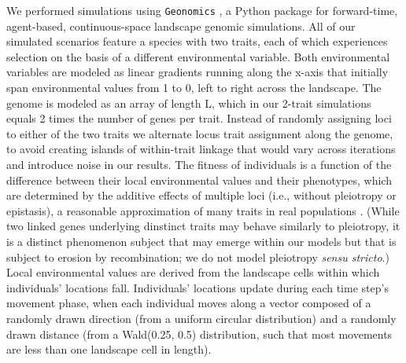 \documentclass[9pt,twocolumn,twoside,lineno]{new_article}
\begin{document}
We performed simulations using \texttt{Geonomics} \cite{terasaki_hart},
a Python \cite{rossum} package for forward-time, agent-based, continuous-space landscape genomic simulations.
All of our simulated scenarios feature
a species with two traits, each of which experiences 
selection on the basis of a different environmental variable.
Both environmental variables are modeled as linear gradients running along the x-axis
that initially span environmental values from 1 to 0, left to right across the landscape.
The genome is modeled as an array of length L,
which in our 2-trait simulations equals 2 times the number of genes per trait.
Instead of randomly assigning loci to either of the two traits
we alternate locus trait assignment along the genome,
to avoid creating islands of within-trait linkage
that would vary across iterations and introduce noise in our results.
The fitness of individuals is a function of the difference between their local
environmental values and their phenotypes, which are determined by the
additive effects of multiple loci (i.e., without pleiotropy or epistasis), a reasonable approximation of many traits in real populations \cite{sella}.
(While two linked genes underlying dinstinct traits may behave similarly to pleiotropy,
it is a distinct phenomenon subject that may emerge within our models but that is subject to erosion by recombination;
we do not model pleiotropy \textit{sensu stricto}.)
Local environmental values are derived from the landscape cells within which individuals' locations fall.
Individuals' locations update during each time step's movement phase,
when each individual moves along a vector composed of a randomly drawn direction
(from a uniform circular distribution) and a randomly drawn distance
(from a Wald(0.25, 0.5) distribution, such that most movements are less than one landscape cell in length).
\end{document}

